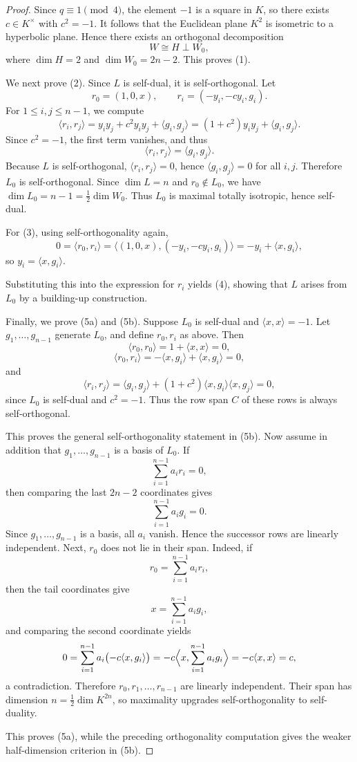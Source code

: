 \documentclass[12pt]{article}
\begin{document}
\begin{proof}
Since $q \equiv 1 \pmod{4}$, the element $-1$ is a square in $K$, so there exists $c \in K^\times$ with $c^2=-1$.
It follows that the Euclidean plane $K^2$ is isometric to a hyperbolic plane.
Hence there exists an orthogonal decomposition
\[
W \cong H \perp W_0,
\]
where $\dim H = 2$ and $\dim W_0 = 2n-2$. This proves (1).

We next prove (2). Since $L$ is self-dual, it is self-orthogonal.
Let
\[
r_0 = (1,0,x), \qquad r_i = (-y_i,-c y_i,g_i).
\]
For $1 \le i,j \le n-1$, we compute
\[
\langle r_i,r_j\rangle
= y_i y_j + c^2 y_i y_j + \langle g_i,g_j\rangle
= (1 + c^2)y_i y_j + \langle g_i,g_j\rangle.
\]
Since $c^2 = -1$, the first term vanishes, and thus
\[
\langle r_i,r_j\rangle = \langle g_i,g_j\rangle.
\]
Because $L$ is self-orthogonal, $\langle r_i,r_j\rangle=0$, hence $\langle g_i,g_j\rangle=0$ for all $i,j$.
Therefore $L_0$ is self-orthogonal.
Since $\dim L = n$ and $r_0 \notin L_0$, we have $\dim L_0 = n-1 = \frac{1}{2}\dim W_0$.
Thus $L_0$ is maximal totally isotropic, hence self-dual.

For (3), using self-orthogonality again,
\[
0 = \langle r_0,r_i\rangle
= \langle (1,0,x),(-y_i,-c y_i,g_i)\rangle
= -y_i + \langle x,g_i\rangle,
\]
so $y_i = \langle x,g_i\rangle$.

Substituting this into the expression for $r_i$ yields (4), showing that $L$ arises from $L_0$ by a building-up construction.

Finally, we prove (5a) and (5b). Suppose $L_0$ is self-dual and $\langle x,x\rangle=-1$.
Let $g_1,\dots,g_{n-1}$ generate $L_0$, and define $r_0,r_i$ as above.
Then
\[
\langle r_0,r_0\rangle = 1 + \langle x,x\rangle = 0,
\]
\[
\langle r_0,r_i\rangle = -\langle x,g_i\rangle + \langle x,g_i\rangle = 0,
\]
and
\[
\langle r_i,r_j\rangle
= \langle g_i,g_j\rangle + (1+c^2)\langle x,g_i\rangle \langle x,g_j\rangle
= 0,
\]
since $L_0$ is self-dual and $c^2=-1$.
Thus the row span $C$ of these rows is always self-orthogonal.

This proves the general self-orthogonality statement in (5b). Now assume in addition that $g_1,\dots,g_{n-1}$ is a basis of $L_0$. If
\[
\sum_{i=1}^{n-1} a_i r_i = 0,
\]
then comparing the last $2n-2$ coordinates gives
\[
\sum_{i=1}^{n-1} a_i g_i = 0.
\]
Since $g_1,\dots,g_{n-1}$ is a basis, all $a_i$ vanish. Hence the successor rows are linearly independent. Next, $r_0$ does not lie in their span. Indeed, if
\[
r_0=\sum_{i=1}^{n-1} a_i r_i,
\]
then the tail coordinates give
\[
x=\sum_{i=1}^{n-1} a_i g_i,
\]
and comparing the second coordinate yields
\[
0=\sum_{i=1}^{n-1} a_i\bigl(-c\langle x,g_i\rangle\bigr)
=-c\Bigl\langle x,\sum_{i=1}^{n-1} a_i g_i\Bigr\rangle
=-c\langle x,x\rangle
=c,
\]
a contradiction. Therefore $r_0,r_1,\dots,r_{n-1}$ are linearly independent. Their span has dimension $n=\frac12\dim K^{2n}$, so maximality upgrades self-orthogonality to self-duality.

This proves (5a), while the preceding orthogonality computation gives the weaker half-dimension criterion in (5b).
\end{proof}
\end{document}
